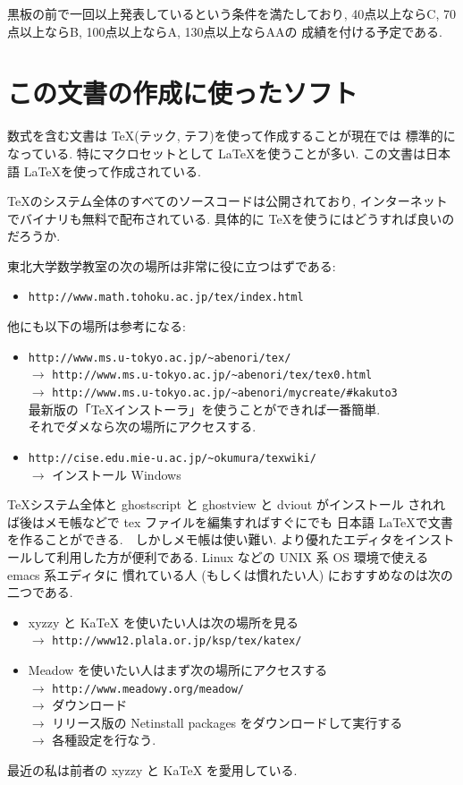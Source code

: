 \documentclass[12pt,twoside]{jarticle}
\begin{document}
黒板の前で一回以上発表しているという条件を満たしており, 
40点以上ならC, 70点以上ならB, 100点以上ならA, 130点以上ならAAの
成績を付ける予定である.


\section*{この文書の作成に使ったソフト}

数式を含む文書は \TeX (テック, テフ)を使って作成することが現在では
標準的になっている. 特にマクロセットとして \LaTeX を使うことが多い.
この文書は日本語 \LaTeX を使って作成されている.

\TeX のシステム全体のすべてのソースコードは公開されており, 
インターネットでバイナリも無料で配布されている.
具体的に \TeX を使うにはどうすれば良いのだろうか.

東北大学数学教室の次の場所は非常に役に立つはずである:
\begin{itemize}
 \item \verb,http://www.math.tohoku.ac.jp/tex/index.html,
\end{itemize}
他にも以下の場所は参考になる:
\begin{itemize}
 \item \verb,http://www.ms.u-tokyo.ac.jp/~abenori/tex/, \\
  $\to$ \verb,http://www.ms.u-tokyo.ac.jp/~abenori/tex/tex0.html, \\
  $\to$ \verb,http://www.ms.u-tokyo.ac.jp/~abenori/mycreate/#kakuto3, \\
  最新版の「TeXインストーラ」を使うことができれば一番簡単. \\
  それでダメなら次の場所にアクセスする.
 \item \verb,http://cise.edu.mie-u.ac.jp/~okumura/texwiki/, \\
  $\to$ インストール Windows
\end{itemize}
\TeX システム全体と ghostscript と ghostview と dviout がインストール
されれば後はメモ帳などで tex ファイルを編集すればすぐにでも
日本語 \LaTeX で文書を作ることができる.　しかしメモ帳は使い難い.  
より優れたエディタをインストールして利用した方が便利である.
Linux などの UNIX 系 OS 環境で使える emacs 系エディタに
慣れている人 (もしくは慣れたい人) におすすめなのは次の二つである.
\begin{itemize}
 \item xyzzy と KaTeX を使いたい人は次の場所を見る \\
  $\to$ \verb,http://www12.plala.or.jp/ksp/tex/katex/,
 \item Meadow を使いたい人はまず次の場所にアクセスする \\
  $\to$ \verb,http://www.meadowy.org/meadow/, \\
  $\to$ ダウンロード \\
  $\to$ リリース版の Netinstall packages をダウンロードして実行する \\
  $\to$ 各種設定を行なう.
\end{itemize}
最近の私は前者の xyzzy と KaTeX を愛用している.
\end{document}
